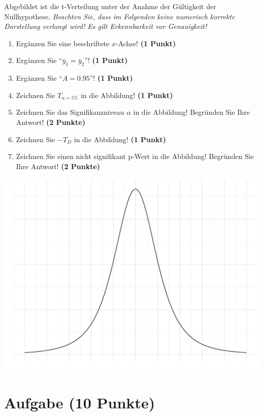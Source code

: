 \documentclass[a4paper, 9pt]{scrartcl}\usepackage[]{graphicx}\usepackage[]{xcolor}
\makeatletter
\def\maxwidth{ %
  \ifdim\Gin@nat@width>\linewidth
    \linewidth
  \else
    \Gin@nat@width
  \fi
}
\makeatother
\begin{document}
Abgebildet ist die t-Verteilung unter der Anahme der G{\"u}ltigkeit der
Nullhypothese. \textit{Beachten Sie, dass im Folgenden keine
  numerisch korrekte Darstellung verlangt wird! Es gilt Erkennbarkeit vor
  Genauigkeit!}

\begin{enumerate}
\item Erg{\"a}nzen Sie eine beschriftete $x$-Achse! \textbf{(1 Punkt)}
\item Erg{\"a}nzen Sie "`$\bar{y}_1 = \bar{y}_2$"'! \textbf{(1 Punkt)} 
\item Erg{\"a}nzen Sie "`$A = 0.95$"'! \textbf{(1 Punkt)}
\item Zeichnen Sie $T_{\alpha=5\%}$ in die Abbildung! \textbf{(1 Punkt)} 
\item Zeichnen Sie das Signifikanzniveau $\alpha$ in die Abbildung! Begr{\"u}nden
  Sie Ihre Antwort! \textbf{(2 Punkte)} 
\item Zeichnen Sie $-T_{D}$ in die Abbildung! \textbf{(1
    Punkt)}
\item Zeichnen Sie einen nicht signifikant p-Wert in die Abbildung! Begr{\"u}nden
  Sie Ihre Antwort! \textbf{(2 Punkte)}   
\end{enumerate}



{\centering \includegraphics[width=\maxwidth]{img/statistisches-testen-3-1} 

}


 
\clearpage

\section{Aufgabe \hfill (10 Punkte)}
\end{document}
